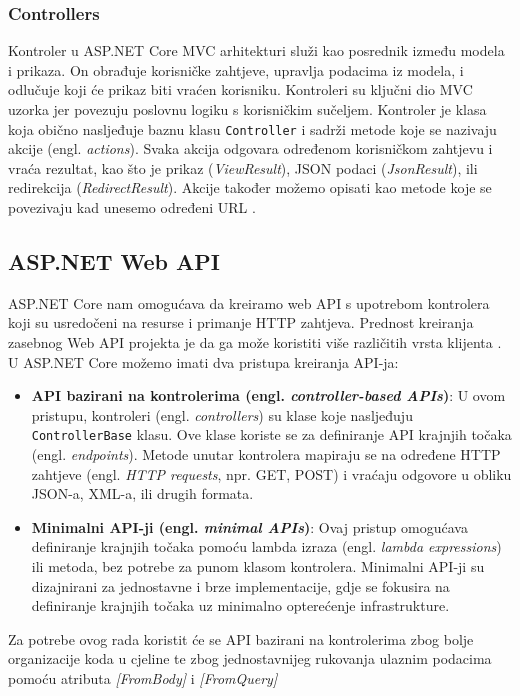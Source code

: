 \documentclass{foi}
\begin{document}
\subsubsection{Controllers}
Kontroler u ASP.NET Core MVC arhitekturi služi kao posrednik između modela i prikaza. On obrađuje korisničke zahtjeve, upravlja podacima iz modela, i odlučuje koji će prikaz biti vraćen korisniku. Kontroleri su ključni dio MVC uzorka jer povezuju poslovnu logiku s korisničkim sučeljem.
Kontroler je klasa koja obično nasljeđuje baznu klasu \texttt{Controller} i sadrži metode koje se nazivaju akcije (engl. \textit{actions}). Svaka akcija odgovara određenom korisničkom zahtjevu i vraća rezultat, kao što je prikaz (\textit{ViewResult}), JSON podaci (\textit{JsonResult}), ili redirekcija (\textit{RedirectResult}).
Akcije također možemo opisati kao metode koje se povezivaju kad unesemo određeni URL \cite{Walther2022}.

\subsection{ASP.NET Web API}
ASP.NET Core nam omogućava da kreiramo web API s upotrebom kontrolera koji su usredočeni na resurse i primanje HTTP zahtjeva. Prednost kreiranja zasebnog Web API projekta je da ga može koristiti više različitih vrsta klijenta \cite{ASPNet2023}.
U ASP.NET Core možemo imati dva pristupa kreiranja API-ja:
\begin{itemize}
    \item \textbf{API bazirani na kontrolerima (engl. \textit{controller-based APIs})}: U ovom pristupu, kontroleri (engl. \textit{controllers}) su klase koje nasljeđuju \texttt{ControllerBase} klasu. Ove klase koriste se za definiranje API krajnjih točaka (engl. \textit{endpoints}). Metode unutar kontrolera mapiraju se na određene HTTP zahtjeve (engl. \textit{HTTP requests}, npr. GET, POST) i vraćaju odgovore u obliku JSON-a, XML-a, ili drugih formata.

    \item \textbf{Minimalni API-ji (engl. \textit{minimal APIs})}: Ovaj pristup omogućava definiranje krajnjih točaka pomoću lambda izraza (engl. \textit{lambda expressions}) ili metoda, bez potrebe za punom klasom kontrolera. Minimalni API-ji su dizajnirani za jednostavne i brze implementacije, gdje se fokusira na definiranje krajnjih točaka uz minimalno opterećenje infrastrukture.
\end{itemize}
Za potrebe ovog rada koristit će se API bazirani na kontrolerima zbog bolje organizacije koda u cjeline te zbog jednostavnijeg rukovanja ulaznim podacima pomoću atributa \textit{[FromBody]} i \textit{[FromQuery]} 
\end{document}
